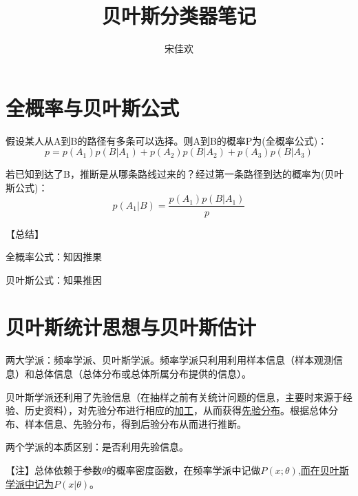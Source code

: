 \documentclass[UTF8]{ctexart} %
\title{贝叶斯分类器笔记}
\author{宋佳欢}
\begin{document}
	\maketitle
	\tableofcontents
	\songti {}
	
	\section{全概率与贝叶斯公式}

		\begin{figure}[H]
		\end{figure}
	
		假设某人从A到B的路径有多条可以选择。则A到B的概率P为(全概率公式)：
		\[p=p(A_1)p(B|A_1)+p(A_2)p(B|A_2)+p(A_3)p(B|A_3)\]
		
		若已知到达了B，推断是从哪条路线过来的？经过第一条路径到达的概率为(贝叶斯公式)：
		\[p(A_1|B) = \frac{p(A_1)p(B|A_1)}{p}\]
		
		【总结】
		
		全概率公式：知因推果
		
		贝叶斯公式：知果推因
		
	\section{贝叶斯统计思想与贝叶斯估计}
		两大学派：频率学派、贝叶斯学派。频率学派只利用利用样本信息（样本观测信息）和总体信息（总体分布或总体所属分布提供的信息）。
		
		贝叶斯学派还利用了先验信息（在抽样之前有关统计问题的信息，主要时来源于经验、历史资料），对先验分布进行相应的\uline{加工}，从而获得\uline{先验分布}。根据总体分布、样本信息、先验分布，得到后验分布从而进行推断。
		
		两个学派的本质区别：是否利用先验信息。
		
		【注】总体依赖于参数$\theta$的概率密度函数，在频率学派中记做$P(x;\theta)$,\uline{而在贝叶斯学派中记为}$P(x|\theta)$。
		
\end{document}
